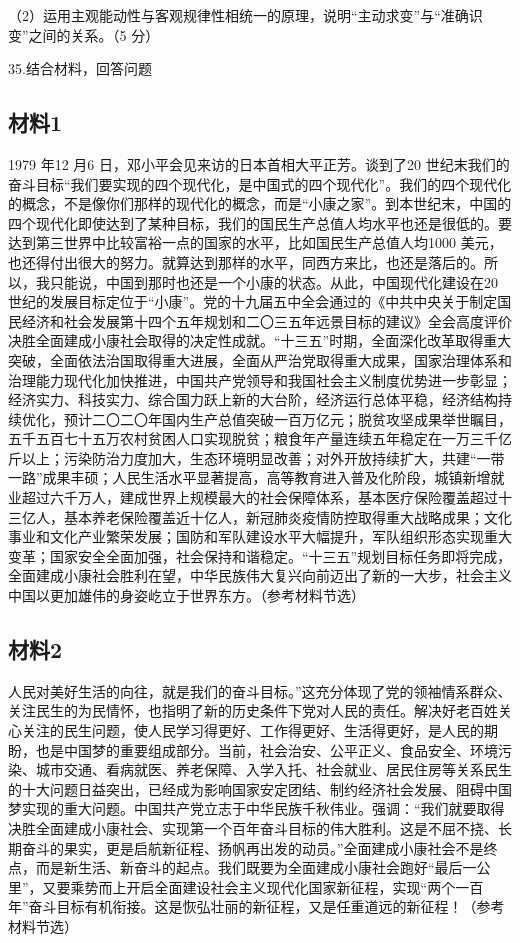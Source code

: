 \documentclass[UTF8,11pt]{ctexart}
\begin{document}
（2）运用主观能动性与客观规律性相统一的原理，说明“主动求变”与“准确识变”之间的关系。（5 分）


35.结合材料，回答问题


\subsection*{材料1}

1979 年12 月6 日，邓小平会见来访的日本首相大平正芳。谈到了20 世纪末我们的奋斗目标“我们要实现的四个现代化，是中国式的四个现代化”。我们的四个现代化的概念，不是像你们那样的现代化的概念，而是“小康之家”。到本世纪末，中国的四个现代化即使达到了某种目标，我们的国民生产总值人均水平也还是很低的。要达到第三世界中比较富裕一点的国家的水平，比如国民生产总值人均1000 美元，也还得付出很大的努力。就算达到那样的水平，同西方来比，也还是落后的。所以，我只能说，中国到那时也还是一个小康的状态。从此，中国现代化建设在20 世纪的发展目标定位于“小康”。党的十九届五中全会通过的《中共中央关于制定国民经济和社会发展第十四个五年规划和二〇三五年远景目标的建议》全会高度评价决胜全面建成小康社会取得的决定性成就。“十三五”时期，全面深化改革取得重大突破，全面依法治国取得重大进展，全面从严治党取得重大成果，国家治理体系和治理能力现代化加快推进，中国共产党领导和我国社会主义制度优势进一步彰显；经济实力、科技实力、综合国力跃上新的大台阶，经济运行总体平稳，经济结构持续优化，预计二〇二〇年国内生产总值突破一百万亿元；脱贫攻坚成果举世瞩目，五千五百七十五万农村贫困人口实现脱贫；粮食年产量连续五年稳定在一万三千亿斤以上；污染防治力度加大，生态环境明显改善；对外开放持续扩大，共建“一带一路”成果丰硕；人民生活水平显著提高，高等教育进入普及化阶段，城镇新增就业超过六千万人，建成世界上规模最大的社会保障体系，基本医疗保险覆盖超过十三亿人，基本养老保险覆盖近十亿人，新冠肺炎疫情防控取得重大战略成果；文化事业和文化产业繁荣发展；国防和军队建设水平大幅提升，军队组织形态实现重大变革；国家安全全面加强，社会保持和谐稳定。“十三五”规划目标任务即将完成，全面建成小康社会胜利在望，中华民族伟大复兴向前迈出了新的一大步，社会主义中国以更加雄伟的身姿屹立于世界东方。（参考材料节选）


\subsection*{材料2}

人民对美好生活的向往，就是我们的奋斗目标。”这充分体现了党的领袖情系群众、关注民生的为民情怀，也指明了新的历史条件下党对人民的责任。解决好老百姓关心关注的民生问题，使人民学习得更好、工作得更好、生活得更好，是人民的期盼，也是中国梦的重要组成部分。当前，社会治安、公平正义、食品安全、环境污染、城市交通、看病就医、养老保障、入学入托、社会就业、居民住房等关系民生的十大问题日益突出，已经成为影响国家安定团结、制约经济社会发展、阻碍中国梦实现的重大问题。中国共产党立志于中华民族千秋伟业。强调：“我们就要取得决胜全面建成小康社会、实现第一个百年奋斗目标的伟大胜利。这是不屈不挠、长期奋斗的果实，更是启航新征程、扬帆再出发的动员。”全面建成小康社会不是终点，而是新生活、新奋斗的起点。我们既要为全面建成小康社会跑好“最后一公里”，又要乘势而上开启全面建设社会主义现代化国家新征程，实现“两个一百年”奋斗目标有机衔接。这是恢弘壮丽的新征程，又是任重道远的新征程！（参考材料节选）
\end{document}
